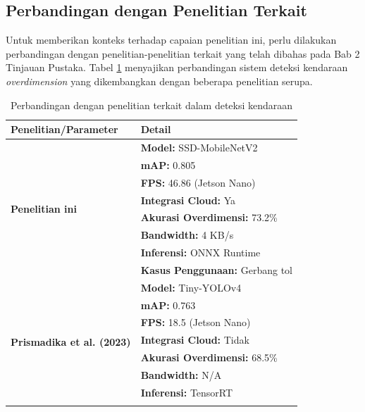 \subsection{Perbandingan dengan Penelitian Terkait}

Untuk memberikan konteks terhadap capaian penelitian ini, perlu dilakukan perbandingan dengan penelitian-penelitian terkait yang telah dibahas pada Bab 2 Tinjauan Pustaka. Tabel \ref{tab:perbandingan_penelitian} menyajikan perbandingan sistem deteksi kendaraan \emph{overdimension} yang dikembangkan dengan beberapa penelitian serupa.

\begin{table}[htbp]
  \centering
  \caption{Perbandingan dengan penelitian terkait dalam deteksi kendaraan}
  \label{tab:perbandingan_penelitian}
  \setlength{\tabcolsep}{4pt}
  \footnotesize
  \begin{tabular}{|l|l|}
    \hline
    \rowcolor[HTML]{C0C0C0}
    \textbf{Penelitian/Parameter} & \textbf{Detail} \\
    \hline
    \multirow{8}{*}{\textbf{Penelitian ini}} & \textbf{Model:} SSD-MobileNetV2 \\
    \cline{2-2}
    & \textbf{mAP:} 0.805 \\
    \cline{2-2}
    & \textbf{FPS:} 46.86 (Jetson Nano) \\
    \cline{2-2}
    & \textbf{Integrasi Cloud:} Ya \\
    \cline{2-2}
    & \textbf{Akurasi Overdimensi:} 73.2\% \\
    \cline{2-2}
    & \textbf{Bandwidth:} 4 KB/s \\
    \cline{2-2}
    & \textbf{Inferensi:} ONNX Runtime \\
    \cline{2-2}
    & \textbf{Kasus Penggunaan:} Gerbang tol \\
    \hline
    \multirow{8}{*}{\textbf{Prismadika et al. (2023) \parencite*{prismadika2023}}} & \textbf{Model:} Tiny-YOLOv4 \\
    \cline{2-2}
    & \textbf{mAP:} 0.763 \\
    \cline{2-2}
    & \textbf{FPS:} 18.5 (Jetson Nano) \\
    \cline{2-2}
    & \textbf{Integrasi Cloud:} Tidak \\
    \cline{2-2}
    & \textbf{Akurasi Overdimensi:} 68.5\% \\
    \cline{2-2}
    & \textbf{Bandwidth:} N/A \\
    \cline{2-2}
    & \textbf{Inferensi:} TensorRT \\
    \cline{2-2}

\end{tabular}
\end{table}
